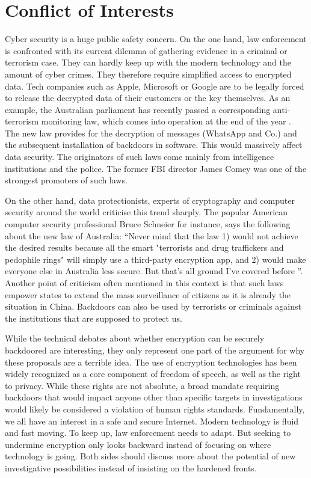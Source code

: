 \documentclass[a4paper, 11pt]{article}
\begin{document}
\section*{Conflict of Interests}
Cyber security is a huge public safety concern. On the one hand, law enforcement is confronted with its current dilemma of gathering evidence in a criminal or terrorism case. They can hardly keep up with the modern technology and the amount of cyber crimes. They therefore require simplified access to encrypted data. Tech companies such as Apple, Microsoft or Google are to be legally forced to release the decrypted data of their customers or the key themselves. As an example, the Australian parliament has recently passed a corresponding anti-terrorism monitoring law, which comes into operation at the end of the year \cite{AUSTRLAW}. The new law provides for the decryption of messages (WhatsApp and Co.) and the subsequent installation of backdoors in software. This would massively affect data security. The originators of such laws come mainly from intelligence institutions and the police. The former FBI director James Comey was one of the strongest promoters of such laws. 
\par On the other hand, data protectionists, experts of cryptography and computer security around the world criticise this trend sharply. The popular American computer security professional Bruce Schneier for instance, says the following about the new law of Australia: \enquote{Never mind that the law 1) would not achieve the desired results because all the smart "terrorists and drug traffickers and pedophile rings" will simply use a third-party encryption app, and 2) would make everyone else in Australia less secure. But that's all ground I've covered before \cite{SCHNEIERBLOG}}. Another point of criticism often mentioned in this context is that such laws empower states to extend the mass surveillance of citizens as it is already the situation in China. Backdoors can also be used by terrorists or criminals against the institutions that are supposed to protect us.
\par While the technical debates about whether encryption can be securely backdoored are interesting, they only represent one part of the argument for why these proposals are a terrible idea. The use of encryption technologies has been widely recognized as a core component of freedom of speech, as well as the right to privacy. While these rights are not absolute, a broad mandate requiring backdoors that would impact anyone other than specific targets in investigations would likely be considered a violation of human rights standards. Fundamentally, we all have an interest in a safe and secure Internet. Modern technology is fluid and fast moving. To keep up, law enforcement needs to adapt. But seeking to undermine encryption only looks backward instead of focusing on where technology is going. Both sides should discuss more about the potential of new investigative possibilities instead of insisting on the hardened fronts.
\end{document}
